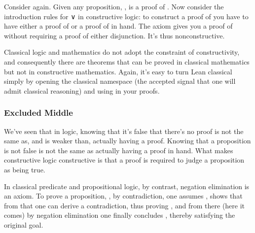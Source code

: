 \documentclass[letterpaper,10pt,english]{sphinxmanual}
\begin{document}
\sphinxAtStartPar
Consider  again. Given any proposition, ,  is
a proof of . Now consider the introduction rules for
∨ in constructive logic: to construct a proof of  you have
to have either a proof of  or a proof of  in hand. The
 axiom gives you a proof of  without requiring a
proof of either disjunction. It’s thus non\sphinxhyphen{}constructive.

\sphinxAtStartPar
Classical logic and mathematics do not adopt the constraint
of constructivity, and consequently there are theorems that
can be proved in classical mathematics but not in constructive
mathematics. Again, it’s easy to turn Lean classical simply
by opening the classical namespace (the accepted signal that
one will admit classical reasoning) and using  in your
proofs.

\begin{sphinxVerbatim}[commandchars=\\\{\}]
     
 
    
\end{sphinxVerbatim}


\subsubsection{Excluded Middle}
\label{\detokenize{A_02_Constructive_Logic:excluded-middle}}
\sphinxAtStartPar
We’ve seen that in  logic, knowing that it’s
false that there’s no proof is not the same as, and is weaker
than, actually having a proof. Knowing that a proposition is
not false is not the same as actually having a proof in hand.
What makes constructive logic constructive is that a proof is
required to judge a proposition as being true.

\sphinxAtStartPar
In classical predicate and propositional logic, by contrast,
negation elimination is an axiom. To prove a proposition, ,
by contradiction, one assumes , shows that from that one
can derive a contradiction, thus proving , and from there
(here it comes) by negation elimination one finally concludes
, thereby satisfying the original goal.
\end{document}
